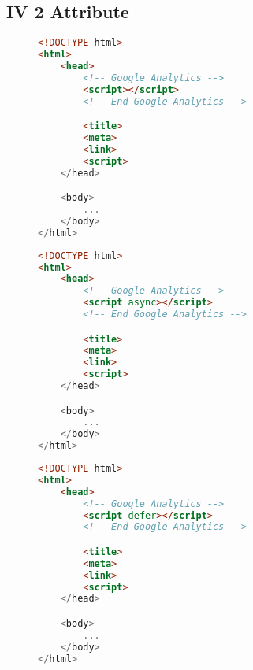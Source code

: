 \subsection{IV 2 Attribute}

\begin{sidewaysfigure}
\begin{multicols}{3}
\begin{center}
\begin{lstlisting}[caption={Attribute 1}, language=html, numbers=none]
<!DOCTYPE html>
<html>
    <head>
        <!-- Google Analytics -->
        <script></script>
        <!-- End Google Analytics -->

        <title>
        <meta>
        <link>
        <script>
    </head>

    <body>
        ...
    </body>
</html>
\end{lstlisting}
\end{center}

\columnbreak

\begin{center}
\begin{lstlisting}[caption={Attribute 2}, language=html, numbers=none]
<!DOCTYPE html>
<html>
    <head>
        <!-- Google Analytics -->
        <script async></script>
        <!-- End Google Analytics -->

        <title>
        <meta>
        <link>
        <script>
    </head>

    <body>
        ...
    </body>
</html>
\end{lstlisting}
\end{center}

\columnbreak

\begin{center}
\begin{lstlisting}[caption={Attribute 3}, language=html, numbers=none]
<!DOCTYPE html>
<html>
    <head>
        <!-- Google Analytics -->
        <script defer></script>
        <!-- End Google Analytics -->

        <title>
        <meta>
        <link>
        <script>
    </head>

    <body>
        ...
    </body>
</html>
\end{lstlisting}
\end{center}
\end{multicols}
\end{sidewaysfigure}








